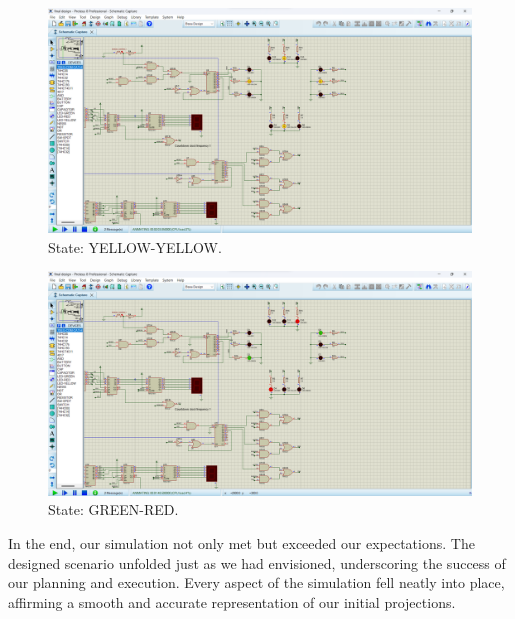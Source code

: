 \documentclass{article}
\begin{document}
\begin{figure}[h]
    \centering
    \includegraphics[width=14cm]{Pic/Proteus/Manual_1.png}
    \caption{State: YELLOW-YELLOW.}
    \label{fig:enter-label}
\end{figure}

\newpage
\begin{figure}[h]
    \centering
    \includegraphics[width=14cm]{Pic/Proteus/Manual_2.png}
    \caption{State: GREEN-RED.}
    \label{fig:enter-label}
\end{figure}


In the end, our simulation not only met but exceeded our expectations. The designed scenario unfolded just as we had envisioned, underscoring the success of our planning and execution. Every aspect of the simulation fell neatly into place, affirming a smooth and accurate representation of our initial projections.\par

\newpage
\end{document}
